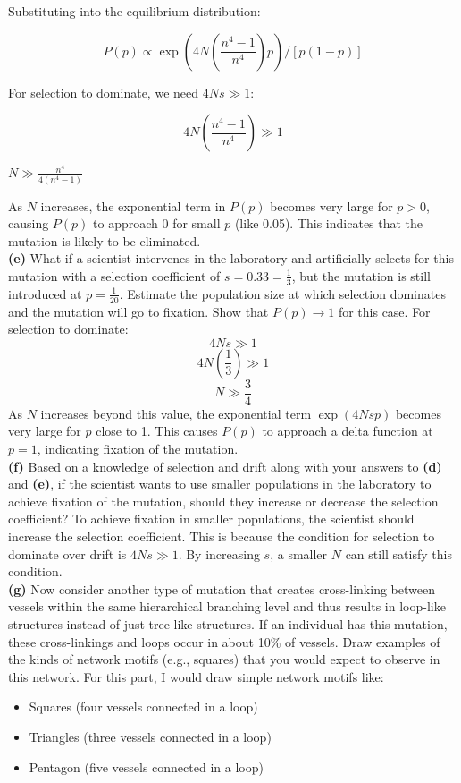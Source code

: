 \documentclass{article}
\begin{document}
Substituting into the equilibrium distribution:

\[
P(p) \propto \exp(4N \left(\frac{n^4 - 1}{n^4}\right)p) / [p(1-p)]
\]

For selection to dominate, we need \( 4Ns \gg 1 \):

\[
4N\left(\frac{n^4 - 1}{n^4}\right) \gg 1
\]

\( N \gg \frac{n^4}{4(n^4 - 1)} \)

As \( N \) increases, the exponential term in \( P(p) \) becomes very large for \( p > 0 \), causing \( P(p) \) to approach 0 for small \( p \) (like 0.05). This indicates that the mutation is likely to be eliminated.\\

\textbf{(e)} What if a scientist intervenes in the laboratory and artificially selects for this mutation with a selection coefficient of \( s = 0.33 = \frac{1}{3} \), but the mutation is still introduced at \( p = \frac{1}{20} \). Estimate the population size at which selection dominates and the mutation will go to fixation. Show that \( P(p) \rightarrow 1 \) for this case.
For selection to dominate:
\[
4Ns \gg 1
\]
\[
4N\left(\frac{1}{3}\right) \gg 1
\]
\[
N \gg \frac{3}{4}
\]
As \( N \) increases beyond this value, the exponential term \( \exp(4Nsp) \) becomes very large for \( p \) close to 1. This causes \( P(p) \) to approach a delta function at \( p = 1 \), indicating fixation of the mutation.\\

\textbf{(f)} Based on a knowledge of selection and drift along with your answers to \textbf{(d)} and \textbf{(e)}, if the scientist wants to use smaller populations in the laboratory to achieve fixation of the mutation, should they increase or decrease the selection coefficient?
To achieve fixation in smaller populations, the scientist should increase the selection coefficient. This is because the condition for selection to dominate over drift is \( 4Ns \gg 1 \). By increasing \( s \), a smaller \( N \) can still satisfy this condition.\\

\textbf{(g)} Now consider another type of mutation that creates cross-linking between vessels within the same hierarchical branching level and thus results in loop-like structures instead of just tree-like structures. If an individual has this mutation, these cross-linkings and loops occur in about 10\% of vessels. Draw examples of the kinds of network motifs (e.g., squares) that you would expect to observe in this network.
For this part, I would draw simple network motifs like:
\begin{itemize}
  \item Squares (four vessels connected in a loop)
  \item Triangles (three vessels connected in a loop)
  \item Pentagon (five vessels connected in a loop)
\end{itemize}
\end{document}
